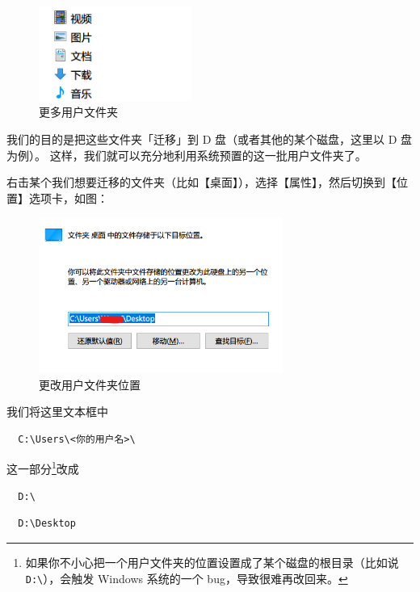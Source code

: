 \begin{figure}[htb!]
  \centering
  \includegraphics[width=5cm]{assets/All_User_Directories.png}
  \caption{更多用户文件夹}
  \label{All_User_Directories}
\end{figure}

我们的目的是把这些文件夹「迁移」到 D 盘（或者其他的某个磁盘，这里以 D 盘为例）。
这样，我们就可以充分地利用系统预置的这一批用户文件夹了。

右击某个我们想要迁移的文件夹（比如【桌面】），选择【属性】，然后切换到【位置】选项卡，如图：

\begin{figure}[htb!]
  \centering
  \includegraphics[width=8cm]{assets/Change_Directories.png}
  \caption{更改用户文件夹位置}
  \label{Change_Directories}
\end{figure}

我们将这里文本框中

\begin{verbatim}
  C:\Users\<你的用户名>\
\end{verbatim}

这一部分\footnote{如果你不小心把一个用户文件夹的位置设置成了某个磁盘的根目录（比如说\texttt{D:\textbackslash}），会触发 Windows 系统的一个 bug，导致很难再改回来。}改成

\begin{verbatim}
  D:\
\end{verbatim}


\begin{verbatim}
  D:\Desktop
\end{verbatim}

